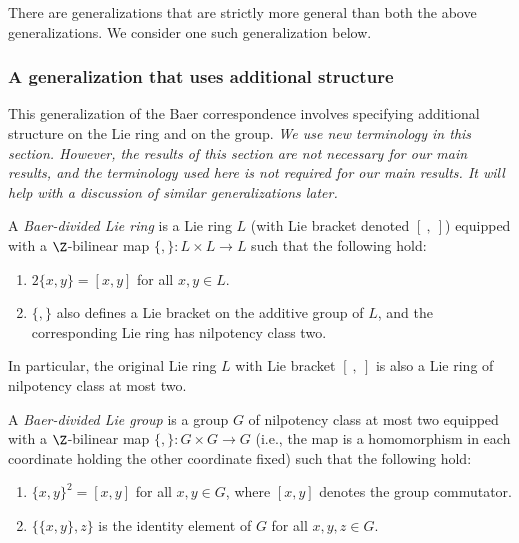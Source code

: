 \documentclass{ucetd}
\begin{document}
There are generalizations that are strictly more general than both the
above generalizations. We consider one such generalization below.

\subsubsection{A generalization that uses additional structure}

This generalization of the Baer correspondence involves specifying
additional structure on the Lie ring and on the group. {\em We use new
  terminology in this section. However, the results of this section
  are not necessary for our main results, and the terminology used
  here is not required for our main results. It will help with a
  discussion of similar generalizations later.}

\begin{definer}
  A {\em Baer-divided Lie ring} is a Lie ring $L$ (with Lie bracket denoted
  $[ \ , \ ]$) equipped with a $\Z$-bilinear map $\{ , \}: L \times L
  \to L$ such that the following hold:

  \begin{enumerate}
  \item $2\{ x, y \} = [x,y]$ for all $x,y \in L$.
  \item $\{ , \}$ also defines a Lie bracket on the additive group of
    $L$, and the corresponding Lie ring has nilpotency class two.
  \end{enumerate}

  In particular, the original Lie ring $L$ with Lie bracket $[ \ ,
    \ ]$ is also a Lie ring of nilpotency class at most two.
\end{definer}

\begin{definer}
  A {\em Baer-divided Lie group} is a group $G$ of nilpotency class at
  most two equipped with a $\Z$-bilinear map $\{ , \}:G \times G \to
  G$ (i.e., the map is a homomorphism in each coordinate holding the
  other coordinate fixed) such that the following hold:

  \begin{enumerate}
  \item $\{ x,y \}^2 = [x,y]$ for all $x,y \in G$, where $[x,y]$
    denotes the group commutator.
  \item $\{ \{x,y \} , z \}$ is the identity element of $G$ for all
    $x,y,z \in G$.
  \end{enumerate}
\end{definer}
\end{document}
